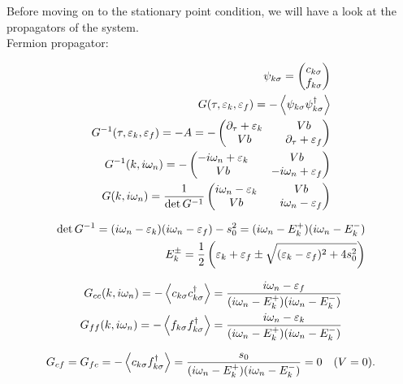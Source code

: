 Before moving on to the stationary point condition, we will have a look at the propagators of the system. \\ 

Fermion propagator: 

\begin{align*}
    \psi_{k\sigma} = \begin{pmatrix} c_{k\sigma} \\ f_{k\sigma} \end{pmatrix} \\ 
    G(\tau, \varepsilon_k, \varepsilon_f) = -\expval{\psi_{k\sigma} \psi_{k\sigma}^\dagger} \\ 
    G^{-1}(\tau, \varepsilon_k, \varepsilon_f) = -A = - \begin{pmatrix} \partial_\tau +\varepsilon_k && Vb \\ Vb && \partial_\tau + \varepsilon_f \end{pmatrix} \\ 
    G^{-1}(k, i\omega_n) = - \begin{pmatrix} -i\omega_n +\varepsilon_k && Vb \\ Vb && -i\omega_n + \varepsilon_f \end{pmatrix} \\
    G(k, i\omega_n) = \frac{1}{\det G^{-1}} \begin{pmatrix} i\omega_n - \varepsilon_k && Vb \\ Vb && i\omega_n - \varepsilon_f \end{pmatrix}
\end{align*}

\begin{align*}
    \det G^{-1} = (i\omega_n - \varepsilon_k)(i\omega_n - \varepsilon_f) - s_0^2 = (i\omega_n - E_k^+)(i\omega_n - E_k^-) \\ 
    E_k^\pm = \frac{1}{2}\left(\varepsilon_k + \varepsilon_f \pm \sqrt{(\varepsilon_k - \varepsilon_f)^2 + 4s_0^2}\right)
\end{align*}

\begin{align*}
    G_{cc}(k,i\omega_n) = -\expval{c_{k\sigma} c_{k\sigma}^\dagger} = \frac{i\omega_n - \varepsilon_f}{(i\omega_n - E_k^+)(i\omega_n - E_k^-)} \\ 
    G_{ff}(k,i\omega_n) = -\expval{f_{k\sigma} f_{k\sigma}^\dagger} = \frac{i\omega_n - \varepsilon_k}{(i\omega_n - E_k^+)(i\omega_n - E_k^-)}
\end{align*}

\begin{align*}
    G_{cf} = G_{fc} = -\expval{c_{k\sigma} f_{k\sigma}^\dagger} = \frac{s_0}{(i\omega_n - E_k^+)(i\omega_n - E_k^-)} = 0 \quad (V = 0).
\end{align*}

